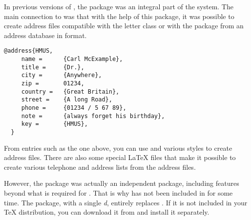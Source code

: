 In previous versions of \KOMAScript{}, the  package was an
integral part of the \KOMAScript{} system.  The main connection to
\KOMAScript{} was that with the help of this package, it was possible to
create address files compatible with the \KOMAScript{} letter class or with
the  package from an address database in \BibTeX{} format.

\begin{lstlisting}[morekeywords={@address}]
  @address{HMUS,
     name =      {Carl McExample},
     title =     {Dr.},
     city =      {Anywhere},
     zip =       01234,
     country =   {Great Britain},
     street =    {A long Road},
     phone =     {01234 / 5 67 89},
     note =      {always forget his birthday},
     key =       {HMUS},
  }
\end{lstlisting}

From entries such as the one above, you can use \BibTeX{} and various
{\BibTeX} styles to create address files. There are also some special \LaTeX{}
files that make it possible to create various telephone and address lists from
the address files.

However, the  package was actually an independent package,
including features beyond what is required for \KOMAScript{}. That is why
 has not been included in \KOMAScript{} for some time. The
 package, with a single \emph{d}, entirely replaces
. If it is not included in your \TeX{} distribution, you can
download it from \cite{package:adrconv} and install it separately.

